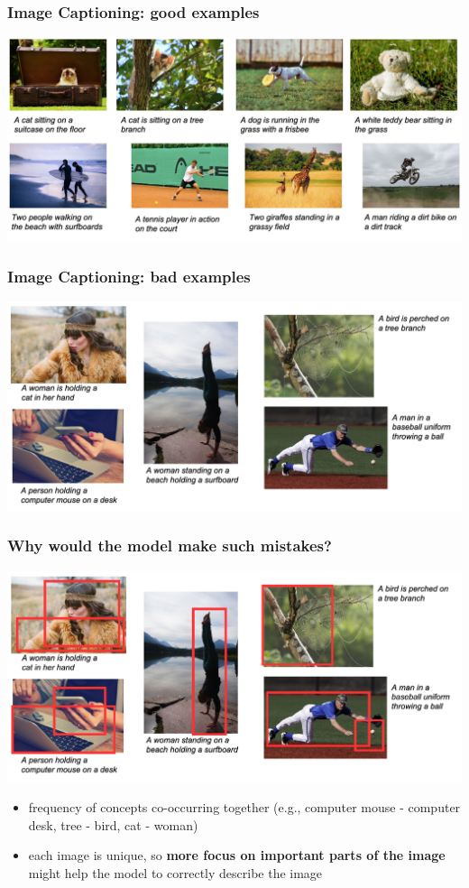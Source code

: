 \documentclass[aspectratio=1610]{beamer} %
\begin{document}
\begin{frame}
\frametitle{Image Captioning: good examples}
\begin{center}
\includegraphics[width=.9\textwidth]{pics/cap9}
\end{center}
\end{frame}

\begin{frame}
\frametitle{Image Captioning: bad examples}
\begin{center}
\includegraphics[width=.9\textwidth]{pics/cap10}
\end{center}
\end{frame}

\begin{frame}
\frametitle{Why would the model make such mistakes?}
\begin{center}
\includegraphics[width=.85\textwidth]{pics/cap11}
\end{center}
\pause
\begin{itemize}
	\item frequency of concepts co-occurring together (e.g., computer mouse - computer desk, tree - bird, cat - woman)
	\pause
	\item each image is unique, so \textbf{more focus on important parts of the image} might help the model to correctly describe the image
\end{itemize}
\end{frame}
\end{document}
